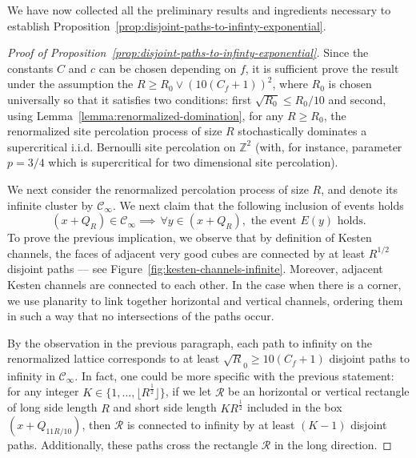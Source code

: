 \documentclass[12pt]{amsart}
\numberwithin{equation}{section}
\begin{document}
	We have now collected all the preliminary results and ingredients necessary to establish Proposition~\ref{prop:disjoint-paths-to-infinty-exponential}.
	
	\begin{proof}[Proof of Proposition~\ref{prop:disjoint-paths-to-infinty-exponential}]
		Since the constants $C$ and $c$ can be chosen depending on $f$, it is sufficient prove the result under the assumption the $R \geq R_0 \vee (10 (C_f + 1))^2$, where $R_0$ is chosen universally so that it satisfies two conditions: first $\sqrt{R_0} \leq R_0/10$ and second, using Lemma~\ref{lemma:renormalized-domination}, for any $R \geq R_0$, the renormalized site percolation process of size $R$ stochastically dominates a supercritical i.i.d. Bernoulli site percolation on $\mathbb{Z}^2$ (with, for instance, parameter $p = 3/4$ which is supercritical for two dimensional site percolation). 
		
		We next consider the renormalized percolation process of size $R$, and denote its infinite cluster by $\mathcal{C}_\infty$. We next claim that the following inclusion of events holds
		\begin{equation} \label{eq:implication-renormalized-cluster}
			(x + Q_R) \in \mathcal{C}_\infty \implies \, \forall y \in (x + Q_R), \mbox{ the event } E \left( y \right) \mbox{ holds}.
		\end{equation}
		To prove the previous implication, we observe that by definition of Kesten channels, the faces of adjacent very good cubes are connected by at least $R^{1/2}$ disjoint paths --- see Figure~\ref{fig:kesten-channels-infinite}. Moreover, adjacent Kesten channels are connected to each other. In the case when there is a corner, we use planarity to link together horizontal and vertical channels, ordering them in such a way that no intersections of the paths occur.
		
		By the observation in the previous paragraph, each path to infinity on the renormalized lattice corresponds to at least $\sqrt{R}_0 \geq 10(C_f + 1)$ disjoint paths to infinity in $\mathscr{C}_{\infty}$. In fact, one could be more specific with the previous statement: for any integer $K \in \{ 1 , \ldots, \lfloor R^{\frac{1}{2}} \rfloor \}$, if we let $\mathcal{R}$ be an horizontal or vertical rectangle of long side length $R$ and short side length $K R^{\frac{1}{2}}$ included in the box $(x + Q_{11R/10})$, then $\mathcal{R}$ is connected to infinity by at least $(K-1)$ disjoint paths. Additionally, these paths cross the rectangle $\mathcal{R}$ in the long direction.
		

\end{proof}
\end{document}
